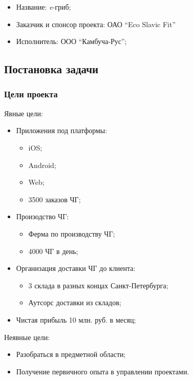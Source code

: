 \documentclass[a4paper,10pt]{article}
\begin{document}
    \begin{itemize}
        \item Название: \textit{e}-гриб;
        \item Заказчик и спонсор проекта: ОАО ``Eco Slavic Fit''
        \item Исполнитель: ООО ``Камбуча-Рус'';
    \end{itemize}

\subsection{Постановка задачи}

\subsubsection{Цели проекта}

Явные цели:

    \begin{itemize}
        \item Приложения под платформы:
            \begin{itemize}
                \item iOS;
                \item Android;
                \item Web;
                \item 3500 заказов ЧГ;
            \end{itemize}
        \item Произодство ЧГ:
            \begin{itemize}
                \item Ферма по производству ЧГ;
                \item 4000 ЧГ в день;
            \end{itemize}
        \item Организация доставки ЧГ до клиента:
            \begin{itemize}
                \item 3 склада в разных концах Санкт-Петербурга;
                \item Аутсорс доставки из складов;
            \end{itemize}
        \item Чистая прибыль 10 млн. руб. в месяц;
    \end{itemize}

Неявные цели:

    \begin{itemize}
        \item Разобраться в предметной области;
        \item Получение первичного опыта в управлении проектами.
    \end{itemize}
\end{document}
